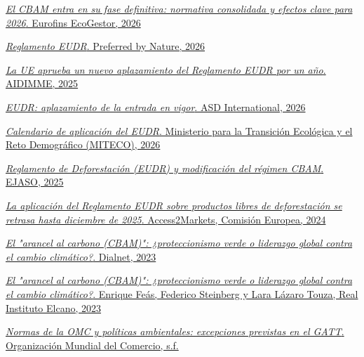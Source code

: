 \documentclass[10pt,a4paper]{article}
\begin{document}
\href{https://www.ecogestor.com/cbam-mecanismo-ajuste-frontera-carbono/}{\textit{El CBAM entra en su fase definitiva: normativa consolidada y efectos clave para 2026}. Eurofins EcoGestor, 2026}

\href{https://www.preferredbynature.org/es/EUDR}{\textit{Reglamento EUDR}. Preferred by Nature, 2026}

\href{https://actualidad.aidimme.es/2025/12/18/la-ue-aprueba-un-nuevo-aplazamiento-del-reglamento-eudr-por-un-ano-alivia-la-gestion-y-otorga-a-las-pyme-6-meses-mas-de-gracia/}{\textit{La UE aprueba un nuevo aplazamiento del Reglamento EUDR por un año}. AIDIMME, 2025}

\href{https://www.asd-int.com/es/mini_blog/reglamento-deforestacion-eudr-entrada-en-vigor-aplazada/}{\textit{EUDR: aplazamiento de la entrada en vigor}. ASD International, 2026}

\href{https://www.miteco.gob.es/es/biodiversidad/temas/politica-forestal/madera-legal-productos-libres-defor/eudr/-que-es-el-eudr-/calendario-de-aplicacion.html}{\textit{Calendario de aplicación del EUDR}. Ministerio para la Transición Ecológica y el Reto Demográfico (MITECO), 2026}

\href{https://ejaso.com/conocimiento/reglamento-de-deforestacion-eudr-y-modificacion-del-regimen-cbam}{\textit{Reglamento de Deforestación (EUDR) y modificación del régimen CBAM}. EJASO, 2025}

\href{https://trade.ec.europa.eu/access-to-markets/es/news/la-aplicacion-del-reglamento-eudr-sobre-productos-libres-de-deforestacion-se-retrasa-hasta}{\textit{La aplicación del Reglamento EUDR sobre productos libres de deforestación se retrasa hasta diciembre de 2025}. Access2Markets, Comisión Europea, 2024}

\href{https://dialnet.unirioja.es/servlet/articulo?codigo=8996373}{\textit{El "arancel al carbono (CBAM)": ¿proteccionismo verde o liderazgo global contra el cambio climático?}. Dialnet, 2023}

\href{https://www.realinstitutoelcano.org/analisis/el-arancel-al-carbono-cbam-proteccionismo-verde-o-liderazgo-global-contra-el-cambio-climatico/}{\textit{El "arancel al carbono (CBAM)": ¿proteccionismo verde o liderazgo global contra el cambio climático?}. Enrique Feás, Federico Steinberg y Lara Lázaro Touza, Real Instituto Elcano, 2023}

\href{https://www.wto.org/spanish/tratop_s/envir_s/envt_rules_exceptions_s.htm}{\textit{Normas de la OMC y políticas ambientales: excepciones previstas en el GATT}. Organización Mundial del Comercio, s.f.}
\end{document}
